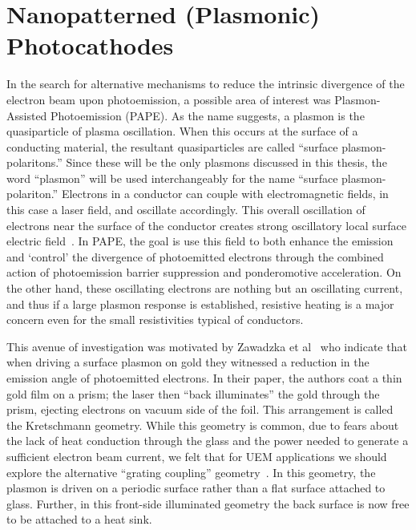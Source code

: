 
\section{Nanopatterned (Plasmonic) Photocathodes}

In the search for alternative mechanisms to reduce the intrinsic divergence of the electron beam upon photoemission, a possible area of interest was Plasmon-Assisted Photoemission (PAPE). 
As the name suggests, a plasmon is the quasiparticle of plasma oscillation.
When this occurs at the surface of a conducting material, the resultant quasiparticles are called ``surface plasmon-polaritons.''
Since these will be the only plasmons discussed in this thesis, the word ``plasmon'' will be used interchangeably for the name ``surface plasmon-polariton.''
Electrons in a conductor can couple with electromagnetic fields, in this case a laser field, and oscillate accordingly.
This overall oscillation of electrons near the surface of the conductor creates strong oscillatory local surface electric field~\cite{cottam_introduction_2004,concepts_2002}.
In PAPE, the goal is use this field to both enhance the emission and `control' the divergence of photoemitted electrons through the combined action of photoemission barrier suppression and ponderomotive acceleration.
On the other hand, these oscillating electrons are nothing but an oscillating current, and thus if a large plasmon response is established, resistive heating is a major concern even for the small resistivities typical of conductors.

This avenue of investigation was motivated by Zawadzka et al~\cite{zawadzka_evanescent_2001} who indicate that when driving a surface plasmon on gold they witnessed a reduction in the emission angle of photoemitted electrons.
In their paper, the authors coat a thin gold film on a prism; the laser then ``back illuminates'' the gold through the prism, ejecting electrons on vacuum side of the foil.
This arrangement is called the Kretschmann geometry.
While this geometry is common, due to fears about the lack of heat conduction through the glass and the power needed to generate a sufficient electron beam current, we felt that for UEM applications we should explore the alternative ``grating coupling'' geometry~\cite{kupersztych_ponderomotive_2001,kupersztych_anomalous_2005,li_surface_2013}.
In this geometry, the plasmon is driven on a periodic surface rather than a flat surface attached to glass.
Further, in this front-side illuminated geometry the back surface is now free to be attached to a heat sink.

